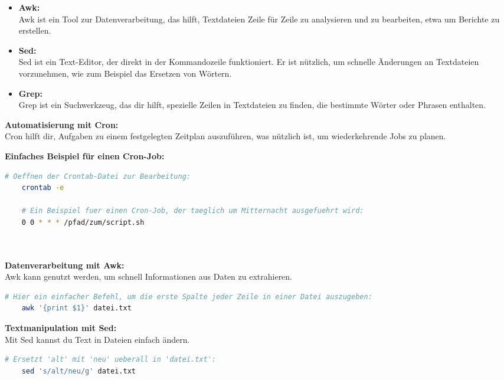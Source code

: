 \documentclass[9pt]{innovativeinnovation-cheatsheet}
\begin{document}
\begin{multicols*}{4}
\begin{itemize}
	\item \textbf{Awk:}\\ Awk ist ein Tool zur Datenverarbeitung, das hilft, Textdateien Zeile für Zeile zu analysieren und zu bearbeiten, etwa um Berichte zu erstellen.
	
	\item \textbf{Sed:} \\ Sed ist ein Text-Editor, der direkt in der Kommandozeile funktioniert. Er ist nützlich, um schnelle Änderungen an Textdateien vorzunehmen, wie zum Beispiel das Ersetzen von Wörtern.
	
	\item \textbf{Grep:} \\ Grep ist ein Suchwerkzeug, das dir hilft, spezielle Zeilen in Textdateien zu finden, die bestimmte Wörter oder Phrasen enthalten.
\end{itemize}

\textbf{Automatisierung mit Cron:} \\
Cron hilft dir, Aufgaben zu einem festgelegten Zeitplan auszuführen, was nützlich ist, um wiederkehrende Jobs zu planen.

\textbf{Einfaches Beispiel für einen Cron-Job:} 
\begin{lstlisting}[language=bash, numbers=none]
	# Oeffnen der Crontab-Datei zur Bearbeitung:
	crontab -e
	
	# Ein Beispiel fuer einen Cron-Job, der taeglich um Mitternacht ausgefuehrt wird:
	0 0 * * * /pfad/zum/script.sh
\end{lstlisting}

\ \\ \\
\textbf{Datenverarbeitung mit Awk:} \\
Awk kann genutzt werden, um schnell Informationen aus Daten zu extrahieren.

\begin{lstlisting}[language=bash, numbers=none]
	# Hier ein einfacher Befehl, um die erste Spalte jeder Zeile in einer Datei auszugeben:
	awk '{print $1}' datei.txt
\end{lstlisting}

\textbf{Textmanipulation mit Sed:} \\
Mit Sed kannst du Text in Dateien einfach ändern.

\begin{lstlisting}[language=bash, numbers=none]
	# Ersetzt 'alt' mit 'neu' ueberall in 'datei.txt':
	sed 's/alt/neu/g' datei.txt
\end{lstlisting}


\end{multicols*}
\end{document}
